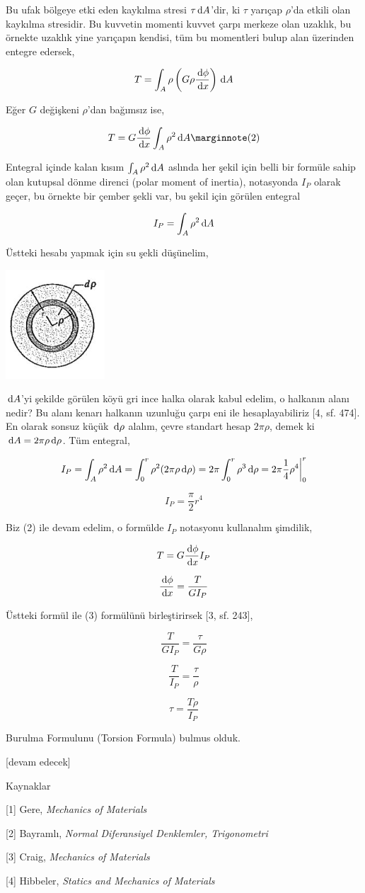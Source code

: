 \documentclass[12pt,fleqn]{article}\usepackage{../../common}
\begin{document}
Bu ufak bölgeye etki eden kaykılma stresi $\tau \,\mathrm{d} A$'dir, ki $\tau$ yarıçap
$\rho$'da etkili olan kaykılma stresidir. Bu kuvvetin momenti kuvvet çarpı
merkeze olan uzaklık, bu örnekte uzaklık yine yarıçapın kendisi, tüm bu
momentleri bulup alan üzerinden entegre edersek,

$$
T = \int_A \rho \left( G \rho \frac{\,\mathrm{d} \phi}{\,\mathrm{d} x} \right) \,\mathrm{d} A
$$

Eğer $G$ değişkeni $\rho$'dan bağımsız ise, 

$$
T = G \frac{\ud \phi}{\ud x} \int_A \rho^2 \ud A
\mlabel{2}
$$

Entegral içinde kalan kısım $\int_A \rho^2 \,\mathrm{d} A$ aslında her şekil için belli
bir formüle sahip olan kutupsal dönme direnci (polar moment of inertia),
notasyonda $I_P$ olarak geçer, bu örnekte bir çember şekli var, bu şekil için
görülen entegral

$$
I_P = \int_A \rho^2 \,\mathrm{d} A
$$

Üstteki hesabı yapmak için su şekli düşünelim, 

\includegraphics[width=10em]{phy_020_strs_06_05.jpg}

$\,\mathrm{d} A$'yi şekilde görülen köyü gri ince halka olarak kabul edelim, o halkanın
alanı nedir? Bu alanı kenarı halkanın uzunluğu çarpı eni ile hesaplayabiliriz
[4, sf. 474]. En olarak sonsuz küçük $\,\mathrm{d} \rho$ alalım, çevre standart hesap
$2\pi\rho$, demek ki $\,\mathrm{d} A = 2\pi\rho \,\mathrm{d} \rho$. Tüm entegral,

$$
I_P = \int_A \rho^2 \,\mathrm{d} A =
\int_{0}^{r} \rho^2 (2\pi\rho \,\mathrm{d} \rho) =
2\pi \int_{0}^{r} \rho^3 \,\mathrm{d} \rho =
2\pi \frac{1}{4} \rho^4 \bigg\vert_{0}^{r}
$$

$$
I_P = \frac{\pi}{2} r^4
$$

Biz (2) ile devam edelim, o formülde $I_P$ notasyonu kullanalım şimdilik,

$$
T = G \frac{\,\mathrm{d} \phi}{\,\mathrm{d} x} I_P
$$

$$
\frac{\,\mathrm{d} \phi}{\,\mathrm{d} x} = \frac{T}{G I_P}
$$

Üstteki formül ile (3) formülünü birleştirirsek [3, sf. 243],

$$
\frac{T}{G I_P} = \frac{\tau}{G \rho }
$$

$$
\frac{T}{I_P} = \frac{\tau}{\rho }
$$

$$
\tau = \frac{T\rho}{I_P} 
$$

Burulma Formulunu (Torsion Formula) bulmus olduk.

[devam edecek]

Kaynaklar

[1] Gere, {\em Mechanics of Materials}

[2] Bayramlı, {\em Normal Diferansiyel Denklemler, Trigonometri}

[3] Craig, {\em Mechanics of Materials}

[4] Hibbeler, {\em Statics and Mechanics of Materials}
\end{document}
